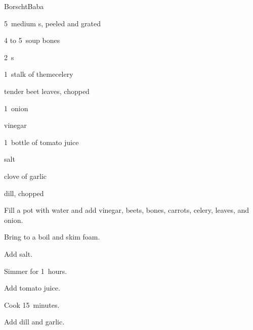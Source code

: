 \begin{recipe}{Borscht}{Baba}{}

\begin{ingredients}
\item 5~medium s, peeled and grated
\item 4 to 5~soup bones
\item 2~s
\item 1~stalk of theme{celery}
\item tender beet leaves, chopped
\item 1~onion
\item {} vinegar
\item 1~bottle of tomato juice
\item {} salt
\item clove of garlic
\item dill, chopped
\end{ingredients}

\begin{directions}
\item Fill a pot with water and add vinegar, beets, bones, carrots, celery, leaves, and onion.
\item Bring to a boil and skim foam.
\item Add salt.
\item Simmer for 1\half~hours.
\item Add tomato juice.
\item Cook 15~minutes.
\item Add dill and garlic.
\end{directions}

\end{recipe}
